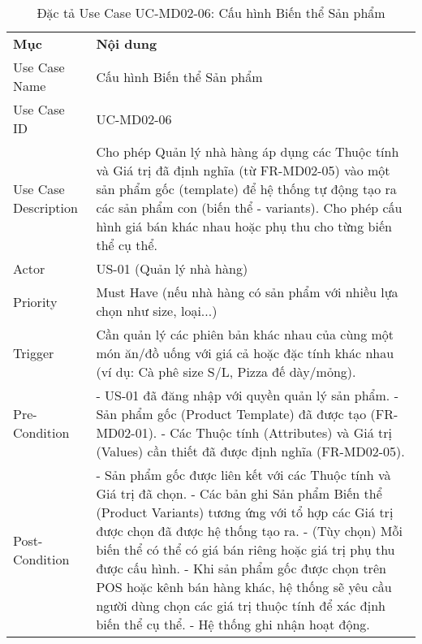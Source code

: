 \begin{longtable}{|m{4cm}|p{11cm}|}
\caption{Đặc tả Use Case UC-MD02-06: Cấu hình Biến thể Sản phẩm} \label{tab:uc_md02_06} \\
\hline

\endhead %

\hline
\endfoot %

\hline
\endlastfoot %
\multicolumn{2}{|c|}{\textbf{2.1. Tóm tắt (Summary)}} \\
\hline
\textbf{Mục} & \textbf{Nội dung} \\
\hline
Use Case Name & Cấu hình Biến thể Sản phẩm \\
\hline
Use Case ID & UC-MD02-06 \\
\hline
Use Case Description & Cho phép Quản lý nhà hàng áp dụng các Thuộc tính và Giá trị đã định nghĩa (từ FR-MD02-05) vào một sản phẩm gốc (template) để hệ thống tự động tạo ra các sản phẩm con (biến thể - variants). Cho phép cấu hình giá bán khác nhau hoặc phụ thu cho từng biến thể cụ thể. \\
\hline
Actor & US-01 (Quản lý nhà hàng) \\
\hline
Priority & Must Have (nếu nhà hàng có sản phẩm với nhiều lựa chọn như size, loại...) \\
\hline
Trigger & Cần quản lý các phiên bản khác nhau của cùng một món ăn/đồ uống với giá cả hoặc đặc tính khác nhau (ví dụ: Cà phê size S/L, Pizza đế dày/mỏng). \\
\hline
Pre-Condition & - US-01 đã đăng nhập với quyền quản lý sản phẩm. \newline - Sản phẩm gốc (Product Template) đã được tạo (FR-MD02-01). \newline - Các Thuộc tính (Attributes) và Giá trị (Values) cần thiết đã được định nghĩa (FR-MD02-05). \\
\hline
Post-Condition & - Sản phẩm gốc được liên kết với các Thuộc tính và Giá trị đã chọn. \newline - Các bản ghi Sản phẩm Biến thể (Product Variants) tương ứng với tổ hợp các Giá trị được chọn đã được hệ thống tạo ra. \newline - (Tùy chọn) Mỗi biến thể có thể có giá bán riêng hoặc giá trị phụ thu được cấu hình. \newline - Khi sản phẩm gốc được chọn trên POS hoặc kênh bán hàng khác, hệ thống sẽ yêu cầu người dùng chọn các giá trị thuộc tính để xác định biến thể cụ thể. \newline - Hệ thống ghi nhận hoạt động. \\

\end{longtable}
